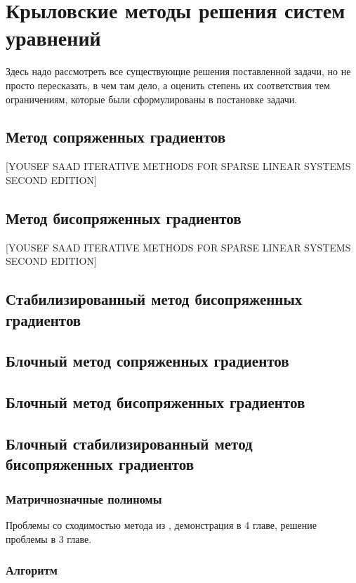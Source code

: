 \section{Крыловские методы решения систем уравнений}
\label{sec:Chapter2} 

Здесь надо рассмотреть все существующие решения поставленной задачи, но не
просто пересказать, в чем там дело, а оценить степень их соответствия тем
ограничениям, которые были сформулированы в постановке задачи.

\subsection{Метод сопряженных градиентов}
[YOUSEF SAAD ITERATIVE METHODS FOR SPARSE LINEAR SYSTEMS SECOND EDITION]
\subsection{Метод бисопряженных градиентов}
[YOUSEF SAAD ITERATIVE METHODS FOR SPARSE LINEAR SYSTEMS SECOND EDITION]
\subsection{Стабилизированный метод бисопряженных градиентов}
\cite{doi:10.1137/0913035}
\subsection{Блочный метод сопряженных градиентов}
\cite{OLEARY1980293}
\subsection{Блочный метод бисопряженных градиентов}
\cite{OLEARY1980293}
\subsection{Блочный стабилизированный метод бисопряженных градиентов}
\cite{elGuennouni2003}
\subsubsection{Матричнозначные полиномы}
 \par Проблемы со сходимостью метода из \cite{elGuennouni2003}, демонстрация в 4 главе, решение проблемы в 3 главе.
 \subsubsection{Алгоритм}


\newpage
